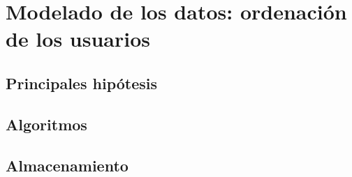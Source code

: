 \chapter{Modelado de los datos: ordenación de los usuarios}
\label{chap:ordenacion_de_usuarios}

\section{Principales hip\'otesis}
\section{Algoritmos}
\section{Almacenamiento}